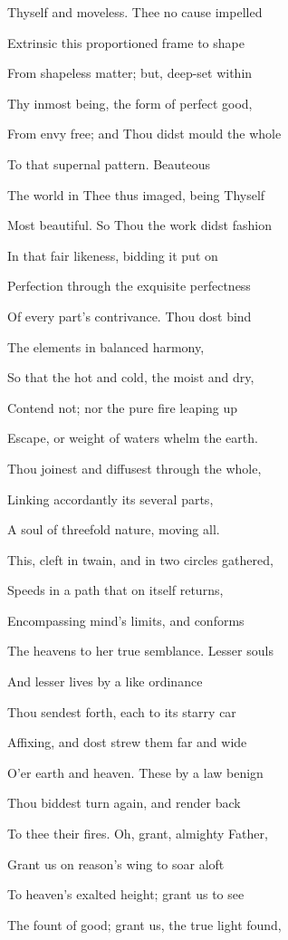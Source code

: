 Thyself and moveless. Thee no cause impelled

Extrinsic this proportioned frame to shape

From shapeless matter; but, deep-set within

Thy inmost being, the form of perfect good,

From envy free; and Thou didst mould the whole

To that supernal pattern. Beauteous

The world in Thee thus imaged, being Thyself

Most beautiful. So Thou the work didst fashion

In that fair likeness, bidding it put on

Perfection through the exquisite perfectness

Of every part's contrivance. Thou dost bind

The elements in balanced harmony,

So that the hot and cold, the moist and dry,

Contend not; nor the pure fire leaping up

Escape, or weight of waters whelm the earth.

Thou joinest and diffusest through the whole,

Linking accordantly its several parts,

A soul of threefold nature, moving all.

This, cleft in twain, and in two circles gathered,

Speeds in a path that on itself returns,

Encompassing mind's limits, and conforms

The heavens to her true semblance. Lesser souls

And lesser lives by a like ordinance

Thou sendest forth, each to its starry car

Affixing, and dost strew them far and wide

O'er earth and heaven. These by a law benign

Thou biddest turn again, and render back

To thee their fires. Oh, grant, almighty Father,

Grant us on reason's wing to soar aloft

To heaven's exalted height; grant us to see

The fount of good; grant us, the true light found,

